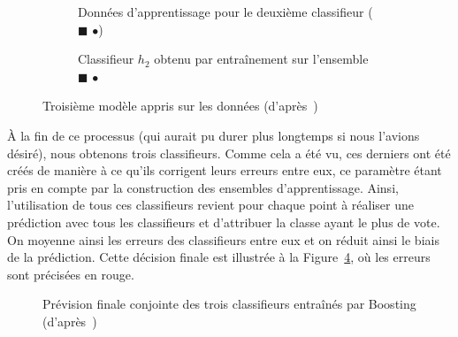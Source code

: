 \begin{figure}[h]
	\begin{margincap}
	\begin{subfigure}{.45\textwidth}
		
		\caption{Données d'apprentissage pour le deuxième classifieur ($\blacksquare$ \large{$\bullet$})}
		\label{fig:boosting_trois_app}
	\end{subfigure}\hfill
	\begin{subfigure}{.45\textwidth}
		
		\caption{Classifieur $h_2$ obtenu par entraînement sur l'ensemble $\blacksquare$ \large{$\bullet$}}
		\label{fig:boosting_trois_modele}
	\end{subfigure}\hfill
	\caption{Troisième modèle appris sur les données (d'après~\cite{bib:elghazel})}
	\end{margincap}
\end{figure}

À la fin de ce processus (qui aurait pu durer plus longtemps si nous l'avions désiré), nous obtenons trois classifieurs. Comme cela a été vu, ces derniers ont été créés de manière à ce qu'ils corrigent leurs erreurs entre eux, ce paramètre étant pris en compte par la construction des ensembles d'apprentissage. Ainsi, l'utilisation de tous ces classifieurs revient pour chaque point à réaliser une prédiction avec tous les classifieurs et d'attribuer la classe ayant le plus de vote. On moyenne ainsi les erreurs des classifieurs entre eux et on réduit ainsi le biais de la prédiction. Cette décision finale est illustrée à la Figure~\ref{fig:boosting_final}, où les erreurs sont précisées en rouge.

\begin{figure}[h]
	\begin{margincap}
	\centering
	
	\caption{Prévision finale conjointe des trois classifieurs entraînés par Boosting (d'après~\cite{bib:elghazel})}
	\label{fig:boosting_final}
	\end{margincap}
\end{figure}


